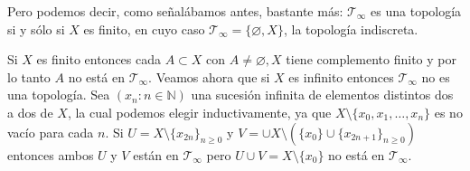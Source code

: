 \documentclass[mid,fleqn,final,oneside]{tareas}
\begin{document}
Pero podemos decir, como señalábamos antes, bastante
más: $\mathcal{T}_\infty$ es una topología si y sólo si $X$ es finito, en cuyo caso
$\mathcal{T}_\infty = \{\varnothing, X\}$, la topología indiscreta. 



Si $X$ es finito entonces cada $A\subset X$ con $A\not = \varnothing,X$
tiene complemento finito y por lo tanto $A$ no está en  $\mathcal{T}_\infty$.
Veamos ahora que si $X$ es infinito entonces $\mathcal{T}_\infty$ no es una topología.
Sea $(x_n\colon n\in\mathbb{N})$ una sucesión infinita de elementos distintos dos a dos de $X$, 
la cual podemos elegir inductivamente, ya que  $X \setminus \{x_0, x_1, \ldots,x_n\}$ es
no vacío para cada $n$. 
Si $U = X\setminus \{x_{2n}\}_{n\geq 0}$ y $V = \cup X \setminus (\{x_0\} \cup \{x_{2n+1}\}_{n\geq 0})$  entonces
ambos $U$ y $V$ están en  $\mathcal{T}_\infty$ pero $U\cup V = X \setminus \{x_0\}$ no está
en    $\mathcal{T}_\infty$. 
\end{document}
